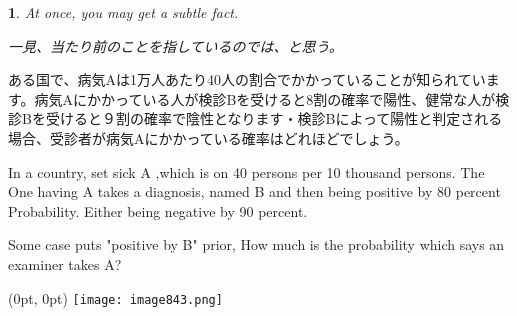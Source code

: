 \documentclass[dvipdfmx,cjk]{beamer} %
\theoremstyle{example}
\newtheorem{prob}[thm]{}
\begin{document}
\begin{frame}
\begin{prob}
At once, you may get a subtle fact.

一見、当たり前のことを指しているのでは、と思う。
\end{prob}
 \begin{example}[検診問題]
ある国で、病気Aは1万人あたり40人の割合でかかっていることが知られています。病気Aにかかっている人が検診Bを受けると8割の確率で陽性、健常な人が検診Bを受けると９割の確率で陰性となります・検診Bによって陽性と判定される場合、受診者が病気Aにかかっている確率はどれほどでしょう。

In a country, set sick A ,which is on 40 persons per 10 thousand persons.
 The One having A takes a diagnosis, named B and then being positive by 80 percent Probability. Either being negative by 90 percent.
 
Some case puts "positive by B" prior,  How much is the probability which  says an examiner takes A? 

\end{example}   
\end{frame}
\begin{frame}
\begin{textblock*}{1\linewidth}(0pt, 0pt)
\centering  \texttt{[image: image843.png]}
\end{textblock*}　 

\end{frame}
\end{document}
